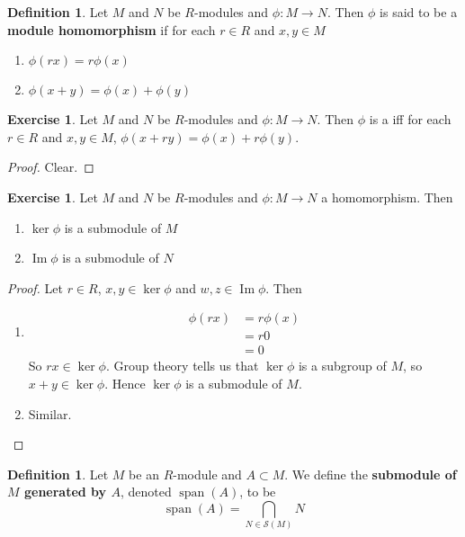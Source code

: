 \documentclass[12pt]{amsart}
\theoremstyle{definition}
\newtheorem{defn}[definition]{Definition}
\theoremstyle{remark}
\theoremstyle{definition}
\newtheorem{ex}[definition]{Exercise}
\newcommand{\MS}{\mathcal{S}}
\DeclareMathOperator{\spn}{span}
\DeclareMathOperator{\Img}{Im}
\begin{document}
	\begin{defn}
	Let $M$ and $N$ be $R$-modules and $\phi:M \rightarrow N$. Then $\phi$ is said to be a \textbf{module homomorphism} if for each $r \in R$ and $x,y \in M$
	\begin{enumerate}
	\item $\phi(rx) = r\phi(x)$
	\item $\phi(x+y) = \phi(x) + \phi(y)$
	\end{enumerate}
	\end{defn}	
	
	\begin{ex}
	Let $M$ and $N$ be $R$-modules and $\phi:M \rightarrow N$. Then $\phi$ is a  iff for each $r \in R$ and $x,y \in M$, $\phi(x+ry) = \phi(x) + r \phi(y)$.
	\end{ex}
	
	\begin{proof}
	Clear.
	\end{proof}
	
	\begin{ex}
	Let $M$ and $N$ be $R$-modules and $\phi:M \rightarrow N$ a homomorphism. Then 
	\begin{enumerate}
	\item $\ker \phi$ is a submodule of $M$
	\item $ \Img \phi$ is a submodule of $N$ 
	\end{enumerate}
	\end{ex}
	
	\begin{proof}
	Let $r \in R$, $x,y \in \ker \phi$ and $w,z \in \Img \phi$. Then 
	\begin{enumerate}
	\item 
	\begin{align*}
	\phi(rx) 
	&= r\phi(x) \\
	&=r 0 \\
	&= 0
\end{align*}	
	So $rx \in \ker \phi$. Group theory tells us that $\ker \phi$ is a subgroup of $M$, so $x+y \in \ker \phi$. Hence $\ker \phi$ is a submodule of $M$. 
	\item Similar.
	\end{enumerate}
	\end{proof}
	
	\begin{defn}
	Let $M$ be an $R$-module and $A \subset M$. We define the \textbf{submodule of $M$ generated by $A$}, denoted $\spn(A)$, to be $$\spn(A) = \bigcap_{N \in \MS(M)} N$$ 
	\end{defn}
	
\end{document}
